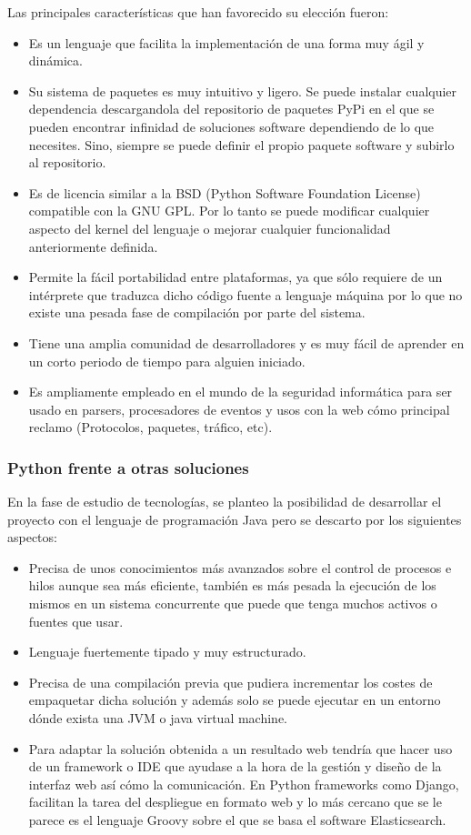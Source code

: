 Las principales características que han favorecido su elección fueron:
\begin{itemize}
\item Es un lenguaje que facilita la implementación de una forma muy ágil y dinámica.
\item Su sistema de paquetes es muy intuitivo y ligero. Se puede instalar cualquier dependencia descargandola del repositorio de paquetes PyPi en el que se pueden encontrar infinidad de soluciones software dependiendo de lo que necesites. Sino, siempre se puede definir el propio paquete software y subirlo al repositorio.
\item Es de licencia similar a la BSD (Python Software Foundation License) compatible con la GNU GPL. Por lo tanto se puede modificar cualquier aspecto del kernel del lenguaje o mejorar cualquier funcionalidad anteriormente definida.
\item Permite la fácil portabilidad entre plataformas, ya que sólo requiere de un intérprete que traduzca dicho código fuente a lenguaje máquina por lo que no existe una pesada fase de compilación por parte del sistema.
\item Tiene una amplia comunidad de desarrolladores y es muy fácil de aprender en un corto periodo de tiempo para alguien iniciado.
\item Es ampliamente empleado en el mundo de la seguridad informática para ser usado en parsers, procesadores de eventos y usos con la web cómo principal reclamo (Protocolos, paquetes, tráfico, etc).
\end{itemize}


\subsubsection{Python frente a otras soluciones}

En la fase de estudio de tecnologías, se planteo la posibilidad de desarrollar el proyecto con el lenguaje de programación Java pero se descarto por los siguientes aspectos:

\begin{itemize}
\item Precisa de unos conocimientos más avanzados sobre el control de procesos e hilos aunque sea más eficiente, también es más pesada la ejecución de los mismos en un sistema concurrente que puede que tenga muchos activos o fuentes que usar.
\item Lenguaje fuertemente tipado y muy estructurado.
\item Precisa de una compilación previa que pudiera incrementar los costes de empaquetar dicha solución y además solo se puede ejecutar en un entorno dónde exista una JVM o java virtual machine.
\item Para adaptar la solución obtenida a un resultado web tendría que hacer uso de un framework o IDE que ayudase a la hora de la gestión y diseño de la interfaz web así cómo la comunicación. En Python frameworks como Django, facilitan la tarea del despliegue en formato web y lo más cercano que se le parece es el lenguaje Groovy sobre el que se basa el software Elasticsearch.
\end{itemize}

